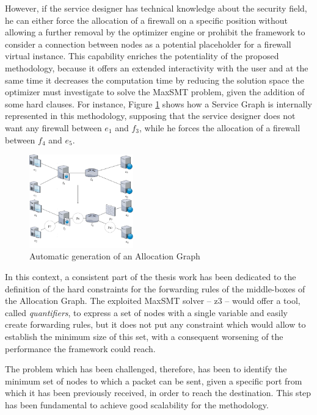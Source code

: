 \documentclass[10pt,a4paper,roman, twocolumn]{article}
\begin{document}
However, if the service designer has technical knowledge about the security field, he can either force the allocation of a firewall on a specific position without allowing a further removal by the optimizer engine or prohibit the framework to consider a connection between nodes as a potential placeholder for a firewall virtual instance. This capability enriches the potentiality of the proposed methodology, because it offers an extended interactivity with the user and at the same time it decreases the computation time by reducing the solution space the optimizer must investigate to solve the MaxSMT problem, given the addition of some hard clauses. For instance, Figure \ref{fig:stoa} shows how a Service Graph is internally represented in this methodology, supposing that the service designer does not want any firewall between $e_{1}$ and $f_{3}$, while he forces the allocation of a firewall between $f_{4}$ and $e_{5}$.
\begin{figure} [tbh]
	\centerline{\includegraphics[width=0.4\textwidth]{images/stoa.png}}
	\caption{Automatic generation of an Allocation Graph}
	\label{fig:stoa}
\end{figure}

In this context, a consistent part of the thesis work has been dedicated to the definition of the hard constraints for the forwarding rules of the middle-boxes of the Allocation Graph. The exploited MaxSMT solver -- z3 -- would offer a tool, called \textit{quantifiers}, to express a set of nodes with a single variable and easily create forwarding rules, but it does not put any constraint which would allow to establish the minimum size of this set, with a consequent worsening of the performance the framework could reach. 

The problem which has been challenged, therefore, has been to identify the minimum set of nodes to which a packet can be sent, given a specific port from which it has been previously received, in order to reach the destination. This step has been fundamental to achieve good scalability for the methodology.
\end{document}
